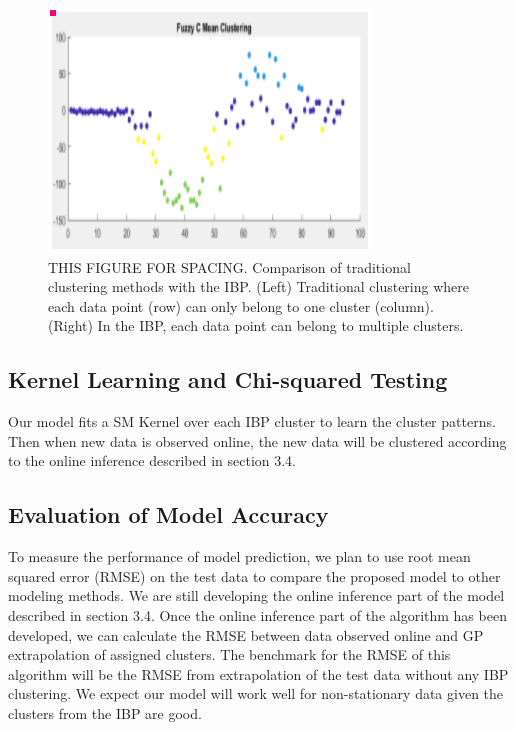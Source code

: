 \documentclass{article}
\begin{document}
\begin{figure}[ht]
\vskip 0.2in
\begin{center}
\centerline{\includegraphics[width=\columnwidth]{IBPClust}}
\caption{THIS FIGURE FOR SPACING. Comparison of traditional clustering methods with the IBP. (Left) Traditional clustering where each data point (row) can only belong to one cluster (column). (Right) In the IBP, each data point can belong to multiple clusters.}
\label{IBPClust}
\end{center}
\vskip -0.2in
\end{figure} 

\subsection{Kernel Learning and Chi-squared Testing}

Our model fits a SM Kernel over each IBP cluster to learn the cluster patterns. Then when new data is observed online, the new data will be clustered according to the online inference described in section 3.4. 

\subsection{Evaluation of Model Accuracy}

To measure the performance of model prediction, we plan to use root mean squared error (RMSE) on the test data to compare the proposed model to other modeling methods. We are still developing the online inference part of the model described in section 3.4. Once the online inference part of the algorithm has been developed, we can calculate the RMSE between data observed online and GP extrapolation of assigned clusters. The benchmark for the RMSE of this algorithm will be the RMSE from extrapolation of the test data without any IBP clustering. We expect our model will work well for non-stationary data given the clusters from the IBP are good. 
\end{document}
